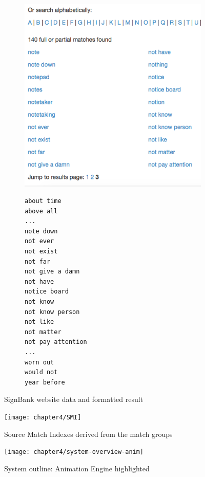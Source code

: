 \documentclass[12pt]{ociamthesis}  %
\begin{document}
\begin{figure}[H]
\centering
\begin{subfigure}[b]{.5\textwidth}
  \hspace*{-0.5cm}
  \includegraphics[scale=0.55]{chapter4/signbank}
  \caption{}
\end{subfigure}
\qquad
\begin{subfigure}[b]{.4\textwidth}
  \small
    \begin{lstlisting}[language=Rules,mathescape=true]
about time
above all
...
note down
not ever
not exist
not far
not give a damn
not have
notice board
not know
not know person
not like
not matter
not pay attention
...
worn out
would not
year before
\end{lstlisting}
  \caption{}
\end{subfigure}
\caption{SignBank website data and formatted result}
\label{fig:signbank}
\end{figure}

\begin{figure}[H]
\centering
\texttt{[image: chapter4/SMI]}
\caption{Source Match Indexes derived from the match groups}
\label{fig:smi}
\end{figure}

\begin{figure}[H]
	\centering
    \texttt{[image: chapter4/system-overview-anim]}
    \caption{System outline: Animation Engine highlighted}
    \label{fig:sys-over-anim}
\end{figure}	
\end{document}
